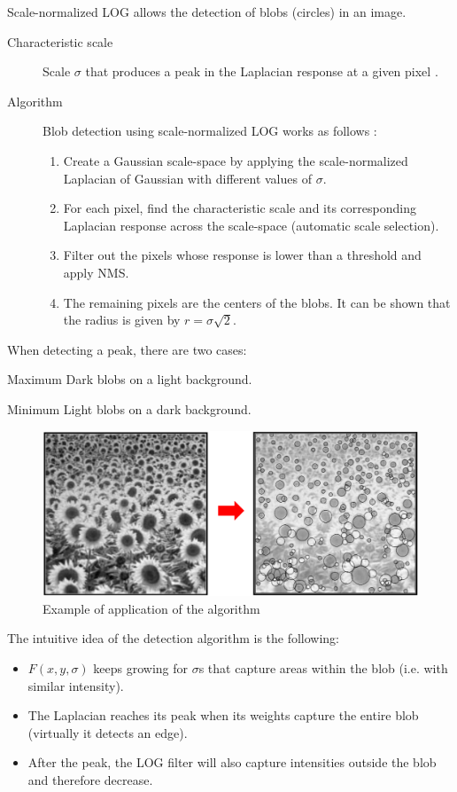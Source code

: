 Scale-normalized LOG allows the detection of blobs (circles) in an image.

\begin{description}
    \item[Characteristic scale] Scale $\sigma$ that produces a peak in the Laplacian response at a given pixel \cite{slides:scale_normalized_log}.
    
    \item[Algorithm]
        Blob detection using scale-normalized LOG works as follows \cite{slides:scale_normalized_log}:
        \begin{enumerate}
            \item Create a Gaussian scale-space by applying the scale-normalized Laplacian of Gaussian with different values of $\sigma$.
            \item For each pixel, find the characteristic scale and its corresponding Laplacian response across the scale-space (automatic scale selection).
            \item Filter out the pixels whose response is lower than a threshold and apply NMS.
            \item The remaining pixels are the centers of the blobs. 
                It can be shown that the radius is given by $r = \sigma\sqrt{2}$.
        \end{enumerate}
\end{description}


When detecting a peak, there are two cases:
\begin{descriptionlist}
    \item[Maximum] Dark blobs on a light background.
    \item[Minimum] Light blobs on a dark background.
\end{descriptionlist}

\begin{figure}[H]
    \centering
    \includegraphics[width=0.6\linewidth]{./img/LOG_blob_detection_example.png}
    \caption{Example of application of the algorithm}
\end{figure}

\begin{remark}
    The intuitive idea of the detection algorithm is the following:
    \begin{itemize}
        \item $F(x, y, \sigma)$ keeps growing for $\sigma$s that capture areas within the blob (i.e. with similar intensity).
        \item The Laplacian reaches its peak when its weights capture the entire blob (virtually it detects an edge).
        \item After the peak, the LOG filter will also capture intensities outside the blob and therefore decrease.
    \end{itemize}
\end{remark}

